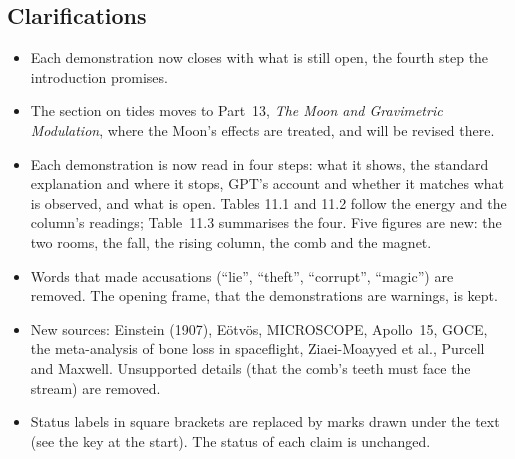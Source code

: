 \documentclass[11pt,a4paper]{article}
\begin{document}
\subsection*{Clarifications}
\begin{itemize}
  \item Each demonstration now closes with what is still open, the fourth step the introduction promises.
  \item The section on tides moves to Part~13, \emph{The Moon and Gravimetric Modulation}, where the Moon's effects are treated, and will be revised there.
  \item Each demonstration is now read in four steps: what it shows, the standard explanation and where it stops, GPT's account and whether it matches what is observed, and what is open. Tables 11.1 and 11.2 follow the energy and the column's readings; Table~11.3 summarises the four. Five figures are new: the two rooms, the fall, the rising column, the comb and the magnet.
  \item Words that made accusations (``lie'', ``theft'', ``corrupt'', ``magic'') are removed. The opening frame, that the demonstrations are warnings, is kept.
  \item New sources: Einstein (1907), E\"otv\"os, MICROSCOPE, Apollo~15, GOCE, the meta-analysis of bone loss in spaceflight, Ziaei-Moayyed et al., Purcell and Maxwell. Unsupported details (that the comb's teeth must face the stream) are removed.
  \item Status labels in square brackets are replaced by marks drawn under the text (see the key at the start). The status of each claim is unchanged.
\end{itemize}

\newpage


\end{document}
